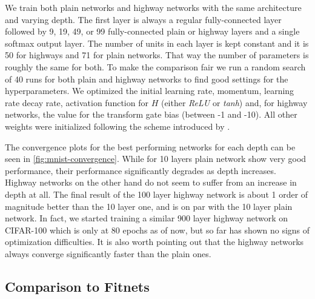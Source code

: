 \documentclass{article}
\begin{document}
We train both plain networks and highway networks with the same architecture and varying depth. The first layer is always a regular fully-connected layer followed by 9, 19, 49, or 99 fully-connected plain or highway layers and a single softmax output layer. The number of units in each layer is kept constant and it is 50 for highways and 71 for plain networks. That way the number of parameters is roughly the same for both.
To make the comparison fair we run a random search of 40 runs for both plain and highway networks to find good settings for the hyperparameters. We optimized the initial learning rate, momentum, learning rate decay rate, activation function for $H$ (either \textit{ReLU} or \textit{tanh}) and, for highway networks, the value for the transform gate bias (between -1 and -10). All other weights were initialized following the scheme introduced by \cite{He2015}. 

The convergence plots for the best performing networks for each depth can be seen in \autoref{fig:mnist-convergence}. While for 10 layers plain network show very good performance, their performance significantly degrades as depth increases. 
Highway networks on the other hand do not seem to suffer from an increase in depth at all. The final result of the 100 layer highway network is about 1 order of magnitude better than the 10 layer one, and is on par with the 10 layer plain network.
In fact, we started training a similar 900 layer highway network on CIFAR-100 which is only at 80 epochs as of now, but so far has shown no signs of optimization difficulties. 
It is also worth pointing out that the highway networks always converge significantly faster than the plain ones.

\subsection{Comparison to Fitnets}
\end{document}

